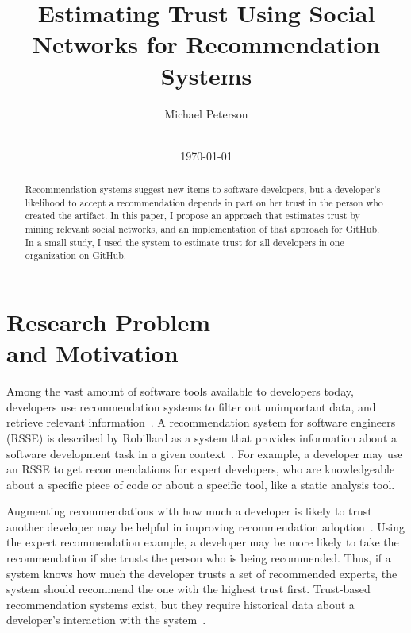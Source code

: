 \documentclass{acm_proc_article-sp}
\begin{document}
\title{Estimating Trust Using Social Networks for Recommendation Systems}


\author{
\alignauthor
  Michael Peterson\\
  \\
}
\date{\today}

\maketitle

\begin{abstract}
  Recommendation systems suggest new items to software developers, but a developer's likelihood to accept a recommendation depends in part on her trust in the person who created the artifact. In this paper, I propose an approach that estimates trust by mining relevant social networks, and an implementation of that approach for GitHub. In a small study, I used the system to estimate trust for all developers in one organization on GitHub.
\end{abstract}

\section{Research Problem \\ and Motivation}
  Among the vast amount of software tools available to developers today, developers use recommendation systems to filter out unimportant data, and retrieve relevant information~\cite{5}. A recommendation system for software engineers (RSSE) is described by Robillard as a system that provides information about a software development task in a given context~\cite{5}.
  For example, a developer may use an RSSE to get recommendations for expert developers, who are knowledgeable about a specific piece of code or about a specific tool, like a static analysis tool.

  Augmenting recommendations with how much a developer is likely to trust another developer may be helpful in improving recommendation adoption~\cite{2}. Using the expert recommendation example, a developer may be more likely to take the recommendation if she trusts the person who is being recommended. Thus, if a system knows how much the developer trusts a set of recommended experts, the system should recommend the one with the highest trust first. Trust-based recommendation systems exist, but they require historical data about a developer's interaction with the system~\cite{3, 4}.
\end{document}
